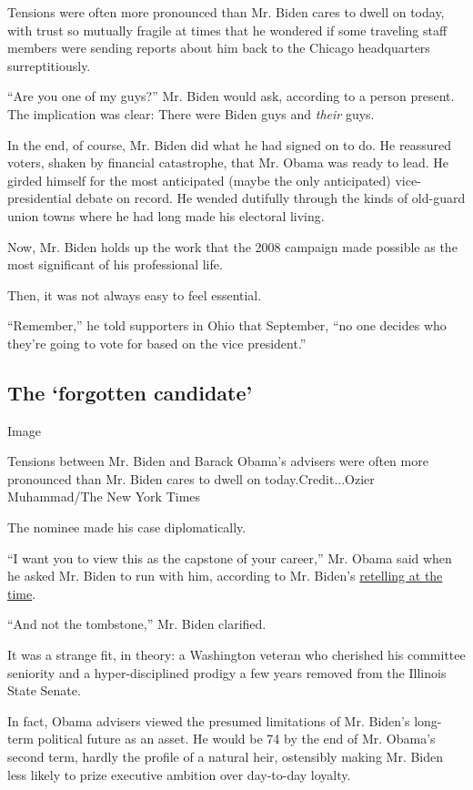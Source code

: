 Tensions were often more pronounced than Mr. Biden cares to dwell on
today, with trust so mutually fragile at times that he wondered if some
traveling staff members were sending reports about him back to the
Chicago headquarters surreptitiously.

``Are you one of my guys?'' Mr. Biden would ask, according to a person
present. The implication was clear: There were Biden guys and
\emph{their} guys.

In the end, of course, Mr. Biden did what he had signed on to do. He
reassured voters, shaken by financial catastrophe, that Mr. Obama was
ready to lead. He girded himself for the most anticipated (maybe the
only anticipated) vice-presidential debate on record. He wended
dutifully through the kinds of old-guard union towns where he had long
made his electoral living.

Now, Mr. Biden holds up the work that the 2008 campaign made possible as
the most significant of his professional life.

Then, it was not always easy to feel essential.

``Remember,'' he told supporters in Ohio that September, ``no one
decides who they're going to vote for based on the vice president.''

\hypertarget{the-forgotten-candidate}{%
\subsection{The `forgotten candidate'}\label{the-forgotten-candidate}}

Image

Tensions between Mr. Biden and Barack Obama's advisers were often more
pronounced than Mr. Biden cares to dwell on today.Credit...Ozier
Muhammad/The New York Times

The nominee made his case diplomatically.

``I want you to view this as the capstone of your career,'' Mr. Obama
said when he asked Mr. Biden to run with him, according to Mr. Biden's
\href{https://www.nytimes.com/2009/03/29/us/politics/29biden.html}{retelling
at the time}.

``And not the tombstone,'' Mr. Biden clarified.

It was a strange fit, in theory: a Washington veteran who cherished his
committee seniority and a hyper-disciplined prodigy a few years removed
from the Illinois State Senate.

In fact, Obama advisers viewed the presumed limitations of Mr. Biden's
long-term political future as an asset. He would be 74 by the end of Mr.
Obama's second term, hardly the profile of a natural heir, ostensibly
making Mr. Biden less likely to prize executive ambition over day-to-day
loyalty.

